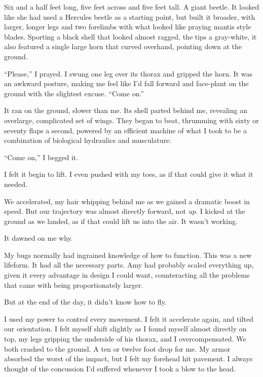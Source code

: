Six and a half feet long, five feet across and five feet tall.  A giant beetle.  It looked like she had used a Hercules beetle as a starting point, but built it broader, with larger, longer legs and two forelimbs with what looked like praying mantis style blades.  Sporting a black shell that looked almost ragged, the tips a gray-white, it also featured a single large horn that curved overhand, pointing down at the ground.



``Please,'' I prayed.  I swung one leg over its thorax and gripped the horn.  It was an awkward posture, making me feel like I'd fall forward and face-plant on the ground with the slightest excuse.  ``Come on.''



It ran on the ground, slower than me.  Its shell parted behind me, revealing an overlarge, complicated set of wings.  They began to beat, thrumming with sixty or seventy flaps a second, powered by an efficient machine of what I took to be a combination of biological hydraulics and musculature.



``Come on,'' I begged it.



I felt it begin to lift.  I even pushed with my toes, as if that could give it what it needed.



We accelerated, my hair whipping behind me as we gained a dramatic boost in speed.  But our trajectory was almost directly forward, not \emph{up}.  I kicked at the ground as we landed, as if that could lift us into the air.  It wasn't working.



It dawned on me why.



My bugs normally had ingrained knowledge of how to function.  This was a new lifeform.  It had all the necessary parts.  Amy had probably scaled everything up, given it every advantage in design I could want, counteracting all the problems that came with being proportionately larger.



But at the end of the day, it didn't know how to fly.



I used my power to control every movement.  I felt it accelerate again, and tilted our orientation.  I felt myself shift slightly as I found myself almost directly on top, my legs gripping the underside of his thorax, and I overcompensated.  We both crashed to the ground.  A ten or twelve foot drop for me.  My armor absorbed the worst of the impact, but I felt my forehead hit pavement.  I always thought of the concussion I'd suffered whenever I took a blow to the head.



